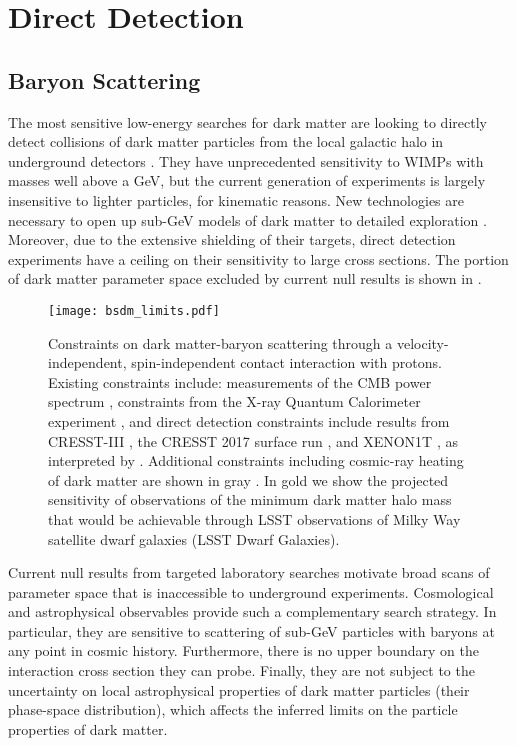 \section{Direct Detection }
\label{sec:direct}

\subsection{Baryon Scattering }

The most sensitive low-energy searches for dark matter are looking to directly detect collisions of dark matter particles from the local galactic halo in underground detectors \citep{2013arXiv1310.8327C}. 
They have unprecedented sensitivity to WIMPs with masses well above a GeV, but the current generation of experiments is largely insensitive to lighter particles, for kinematic reasons. 
New technologies are necessary to open up sub-GeV models of dark matter to detailed exploration \citep{Battaglieri:2017aum}. 
Moreover, due to the extensive shielding of their targets, direct detection experiments have a ceiling on their sensitivity to large cross sections. 
The portion of dark matter parameter space excluded by current null results is shown in . 
\begin{figure}
\centering
\texttt{[image: bsdm\_limits.pdf]}
\caption{
Constraints on dark matter-baryon scattering through a velocity-independent, spin-independent contact interaction with protons. 
Existing constraints include: measurements of the CMB power spectrum \citep[CMB;][]{Gluscevic:2017ywp}, constraints from the X-ray Quantum Calorimeter experiment \citep[XQC;][]{0704.0794}, and direct detection constraints include results from CRESST-III \citep{1711.07692}, the CRESST 2017 surface run \citep{1707.06749}, and XENON1T \citep{1705.06655}, as interpreted by \citep[Direct Detection;][]{1802.04764}. %
Additional constraints including cosmic-ray heating of dark matter are shown in gray \citep[MiniBoone CR \& XENON1T CR][]{1810.10543}.
In gold we show the projected sensitivity of observations of the minimum dark matter halo mass that would be achievable through LSST observations of Milky Way satellite dwarf galaxies (LSST Dwarf Galaxies).
}
\label{fig:dd}
\end{figure}

Current null results from targeted laboratory searches motivate broad scans of parameter space that is inaccessible to underground experiments. Cosmological and astrophysical observables provide such a complementary search strategy. In particular, they are sensitive to scattering of sub-GeV particles with baryons at any point in cosmic history. Furthermore, there is no upper boundary on the interaction cross section they can probe. Finally, they are not subject to the uncertainty on local astrophysical properties of dark matter particles (their phase-space distribution), which affects the inferred limits on the particle properties of dark matter. 

